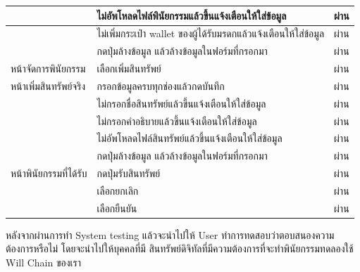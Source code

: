 \documentclass[12pt,oneside,openright,a4paper]{cpe-thai-project}
\begin{document}
\begin{table}[h]
\begin{tabular}{|l|l|l|}
                       & ไม่อัพโหลดไฟล์พินัยกรรมแล้วขึ้นแจ้งเตือนให้ใส่ข้อมูล                      &      \multicolumn{1}{c|}{{\color[HTML]{228B22} ผ่าน}}  \\ \hline
                       & ไม่เพิ่มกระเป๋า wallet ของผู้ได้รับมรดกแล้วแจ้งเตือนให้ใส่ข้อมูล        & \multicolumn{1}{c|}{{\color[HTML]{228B22} ผ่าน}}        \\ \hline             
                       & กดปุ่มล้างข้อมูล แล้วล้างข้อมูลในฟอร์มที่กรอกมา       & \multicolumn{1}{c|}{{\color[HTML]{228B22} ผ่าน}}        \\ \hline                    
หน้าจัดการพินัยกรรม        & เลือกเพิ่มสินทรัพย์                              & \multicolumn{1}{c|}{{\color[HTML]{228B22} ผ่าน}}  \\ \hline                
หน้าเพิ่มสินทรัพย์จริง        & กรอกข้อมูลครบทุกช่องแล้วกดบันทึก                      &   \multicolumn{1}{c|}{{\color[HTML]{228B22} ผ่าน}}  \\ \hline
                       & ไม่กรอกชื่อสินทรัพย์แล้วขึ้นแจ้งเตือนให้ใส่ข้อมูล                                &  \multicolumn{1}{c|}{{\color[HTML]{228B22} ผ่าน}}     \\ \hline
                       & ไม่กรอกคำอธิบายแล้วขึ้นแจ้งเตือนให้ใส่ข้อมูล                          &    \multicolumn{1}{c|}{{\color[HTML]{228B22} ผ่าน}}   \\ \hline
                       & ไม่อัพโหลดไฟล์สินทรัพย์แล้วขึ้นแจ้งเตือนให้ใส่ข้อมูล                       & \multicolumn{1}{c|}{{\color[HTML]{228B22} ผ่าน}}      \\ \hline                    
                        & กดปุ่มล้างข้อมูล แล้วล้างข้อมูลในฟอร์มที่กรอกมา       & \multicolumn{1}{c|}{{\color[HTML]{228B22} ผ่าน}}        \\ \hline        
หน้าพินัยกรรมที่ได้รับ & กดปุ่มรับสินทรัพย์                              & \multicolumn{1}{c|}{{\color[HTML]{228B22} ผ่าน}}      \\ \hline
                       & เลือกยกเลิก                           &    \multicolumn{1}{c|}{{\color[HTML]{228B22} ผ่าน}}    \\ \hline
                       & เลือกยืนยัน                     & \multicolumn{1}{c|}{{\color[HTML]{228B22} ผ่าน}}      \\ \hline
\end{tabular}
\end{table}
\tab หลังจากผ่านการทำ System testing แล้วจะนำไปให้ User ทำการทดสอบว่าตอบสนองความต้องการหรือไม่ โดยจะนำไปให้บุคคลที่มี สินทรัพย์ดิจิทัลที่มีความต้องการที่จะทำพินัยกรรมทดลองใช้ Will Chain ของเรา
\end{document}
